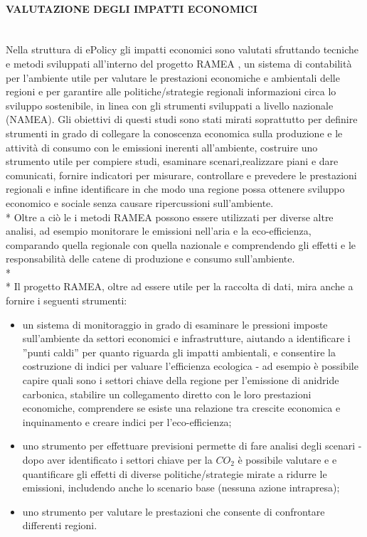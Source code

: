 \documentclass[12pt,a4paper,openright,twoside]{report}
\newcommand{\myparagraph}[1]{\paragraph{#1}\mbox{}\\}
\begin{document}
\myparagraph{VALUTAZIONE DEGLI IMPATTI ECONOMICI}
Nella struttura di ePolicy gli impatti economici sono valutati sfruttando tecniche e metodi sviluppati all'interno del progetto RAMEA \cite{ramea}, un sistema di contabilità per l'ambiente utile per valutare le prestazioni economiche e ambientali delle regioni e per garantire alle politiche/strategie regionali informazioni circa lo sviluppo sostenibile, in linea con gli strumenti sviluppati a livello nazionale (NAMEA). Gli obiettivi di questi studi sono stati mirati soprattutto per definire strumenti in grado di collegare la conoscenza economica sulla produzione e le attività di consumo con le emissioni inerenti all'ambiente, costruire uno strumento utile per compiere studi, esaminare scenari,realizzare piani e dare comunicati, fornire indicatori per misurare, controllare e prevedere le prestazioni regionali e infine identificare in che modo una regione possa ottenere sviluppo economico e sociale senza causare ripercussioni sull'ambiente.\\*
Oltre a ciò le i metodi RAMEA possono essere utilizzati per diverse altre analisi, ad esempio monitorare le emissioni nell'aria e la eco-efficienza, comparando quella regionale con quella nazionale e comprendendo gli effetti e le responsabilità delle catene di produzione e consumo sull'ambiente. \\*\\*
Il progetto RAMEA, oltre ad essere utile per la raccolta di dati, mira anche a fornire i seguenti strumenti:
\begin{itemize}
\item un sistema di monitoraggio in grado di esaminare le pressioni imposte sull'ambiente da settori economici e infrastrutture, aiutando a identificare i ''punti caldi'' per quanto riguarda gli impatti ambientali, e consentire la costruzione di indici per valuare l'efficienza ecologica - ad esempio è possibile capire quali sono i settori chiave della regione per l'emissione di anidride carbonica, stabilire un collegamento diretto con le loro prestazioni economiche, comprendere se esiste una relazione tra crescite economica e inquinamento e creare indici per l'eco-efficienza;
\item uno strumento per effettuare previsioni permette di fare analisi degli scenari - dopo aver identificato i settori chiave per la $CO_2$ è possibile valutare e e quantificare gli effetti di diverse politiche/strategie mirate a ridurre le emissioni, includendo anche lo scenario base (nessuna azione intrapresa);
\item uno strumento per valutare le prestazioni che consente di confrontare differenti regioni. 
\end{itemize}
 
\end{document}
